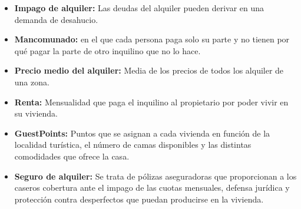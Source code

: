 \begin{itemize}
\item \textbf{Impago de alquiler:} Las deudas del alquiler pueden derivar en una demanda de desahucio.

\item \textbf{Mancomunado:} en el que cada persona paga solo su parte y no tienen por qué pagar la parte de otro inquilino que no lo hace. 

\item \textbf{Precio medio del alquiler:} Media de los precios de todos los alquiler de una zona.

\item \textbf{Renta:} Mensualidad que paga el inquilino al propietario por poder vivir en su vivienda.

\item \textbf{GuestPoints:} Puntos que se asignan a cada vivienda en función de la localidad turística, el número de camas disponibles y las distintas comodidades que ofrece la casa.

\item \textbf{Seguro de alquiler:} Se trata de pólizas aseguradoras que proporcionan a los caseros cobertura ante el impago de las cuotas mensuales, defensa jurídica y protección contra desperfectos que puedan producirse en la vivienda.


\end{itemize}
